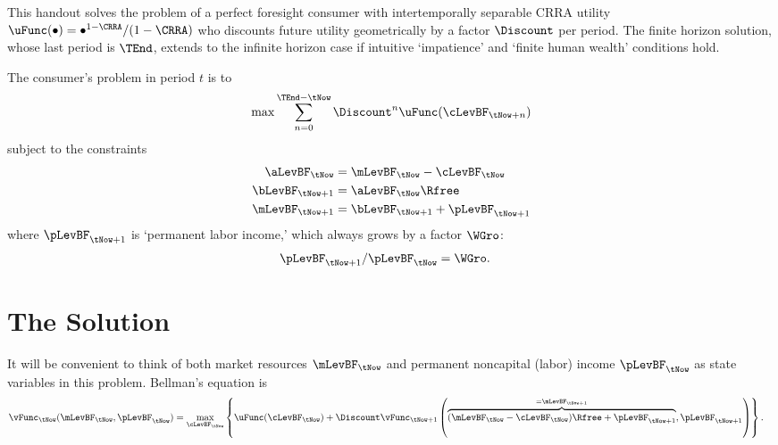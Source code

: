 This handout solves the problem of a perfect foresight consumer with intertemporally separable CRRA utility
$\uFunc(\bullet)= \bullet^{1-\CRRA}/(1-\CRRA)$ who discounts future utility
geometrically by a factor $\Discount$ per period.  The finite horizon
solution, whose last period is $\TEnd$, extends to the infinite horizon case if
intuitive `impatience' and `finite human wealth' conditions hold.

The consumer's problem in period $t$ is to
\begin{equation}
\max \sum_{n=0}^{\TEnd-\tNow} \Discount^{n} \uFunc(\cLevBF_{\tNow+n})                \label{eq:maxprob}
\end{equation}
subject to the constraints 
\begin{equation}\begin{gathered}\begin{aligned}
      \aLevBF_{\tNow}   & =  \mLevBF_{\tNow}-\cLevBF_{\tNow}
\\    \bLevBF_{\tNow+1} & =  \aLevBF_{\tNow}\Rfree
\\    \mLevBF_{\tNow+1} & =  \bLevBF_{\tNow+1}+\pLevBF_{\tNow+1}
\end{aligned}\end{gathered}\end{equation}
where $\pLevBF_{\tNow+1}$ is `permanent labor income,' which always grows by a factor $\WGro$:
\begin{equation}\begin{gathered}\begin{aligned}
        \pLevBF_{\tNow+1}/\pLevBF_{\tNow} & =  {\WGro}.
\end{aligned}\end{gathered}\end{equation}

\section{The Solution}

It will be convenient to think of both market resources $\mLevBF_{\tNow}$ and permanent noncapital (labor) income $\pLevBF_{\tNow}$
as state variables in this problem.  Bellman's equation is 
\begin{equation}\begin{gathered}\begin{aligned}
        \vFunc_{\tNow}(\mLevBF_{\tNow},\pLevBF_{\tNow}) & =  \max_{\cLevBF_{\tNow}} \left\{ \uFunc(\cLevBF_{\tNow}) + \Discount \vFunc_{\tNow+1}\left(\overbrace{(\mLevBF_{\tNow}-\cLevBF_{\tNow})\Rfree+\pLevBF_{\tNow+1}}^{=\mLevBF_{\tNow+1}},\pLevBF_{\tNow+1}\right)\right\}.
        \label{eq:vmax}
\end{aligned}\end{gathered}\end{equation}

